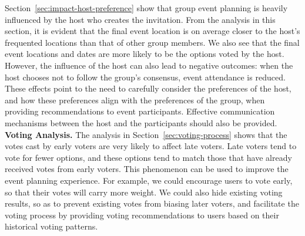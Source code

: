 {Section~\ref{sec:impact-host-preference} show that group event planning is
heavily influenced by the host who creates the invitation.  From the analysis in this section,
it is evident that the final event location is on average closer to the host's
frequented locations than that of other group members.  We also see that
the final event locations and dates are more likely to be the options voted by the
host.  However, the influence of the host can also lead to negative outcomes:
when the host chooses not to follow the group's consensus, event attendance is
reduced.  These effects point to the need to carefully consider the preferences
of the host, and how these preferences align with the preferences of the group, when
providing recommendations to event participants.  Effective communication
mechanisms between the host and the participants should also be provided.
\newline \textbf{Voting Analysis.}  The analysis in
Section~\ref{sec:voting-process} shows that the votes cast by early voters are
very likely to affect late voters.  Late voters tend to vote for fewer options,
and these options tend to match those that have already received votes from
early voters.  This phenomenon can be used to improve the event planning
experience.  For example, we could encourage users to vote early, so that their
votes will carry more weight.  We could also hide existing voting results, so as
to prevent existing votes from biasing later voters, and facilitate the voting
process by providing voting recommendations to users based on their historical
voting patterns.
}




